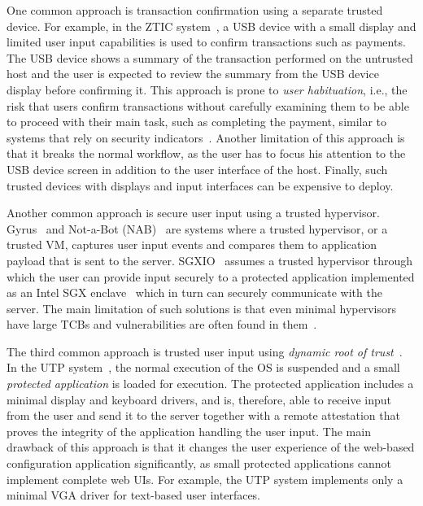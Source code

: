  One common approach is transaction confirmation using a separate trusted device. For example, in the ZTIC system~\cite{weigold2011}, a USB device with a small display and limited user input capabilities is used to confirm transactions such as payments. The USB device shows a summary of the transaction performed on the untrusted host and the user is expected to review the summary from the USB device display before confirming it. This approach is prone to \emph{user habituation}, i.e., the risk that users confirm transactions without carefully examining them to be able to proceed with their main task, such as completing the payment, similar to systems that rely on security indicators~\cite{schechter2007emperor,197283,41927}. Another limitation of this approach is that it breaks the normal workflow, as the user has to focus his attention to the USB device screen in addition to the user interface of the host. Finally, such trusted devices with displays and input interfaces can be expensive to deploy. 

 Another common approach is secure user input using a trusted hypervisor. Gyrus~\cite{gyrus} and Not-a-Bot (NAB)~\cite{nab} are systems where a trusted hypervisor, or a trusted VM, captures user input events and compares them to application payload that is sent to the server. SGXIO~\cite{sgxio} assumes a trusted hypervisor through which the user can provide input securely to a protected application implemented as an Intel SGX enclave~\cite{sgx} which in turn can securely communicate with the server. The main limitation of such solutions is that even minimal hypervisors have large TCBs and vulnerabilities are often found in them~\cite{hashizume2013analysis,perez2013characterizing}.

 The third common approach is trusted user input using \emph{dynamic root of trust}~\cite{mccune2008flicker}. In the UTP system~\cite{utp}, the normal execution of the OS is suspended and a small \emph{protected application} is loaded for execution. The protected application includes a minimal display and keyboard drivers, and is, therefore, able to receive input from the user and send it to the server together with a remote attestation that proves the integrity of the application handling the user input. The main drawback of this approach is that it changes the user experience of the web-based configuration application significantly, as small protected applications cannot implement complete web UIs. For example, the UTP system implements only a minimal VGA driver for text-based user interfaces.


